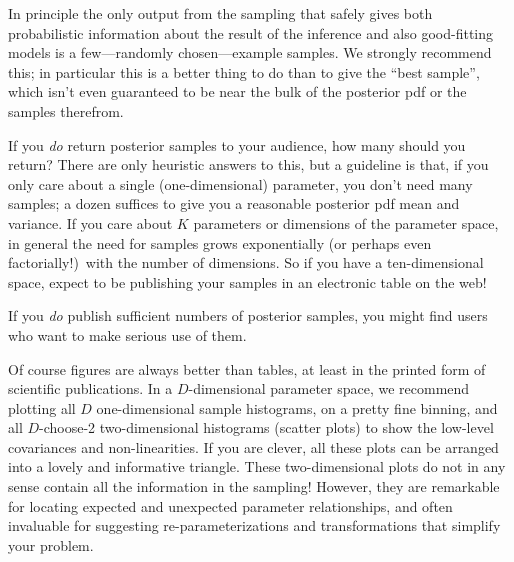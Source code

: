 \documentclass[12pt,twoside,pdftex]{article}
\begin{document}
In principle the only output from the sampling that safely gives both
probabilistic information about the result of the inference and also
good-fitting models is a few---randomly chosen---example samples.
We strongly recommend this; in
particular this is a better thing to do than to give the ``best
sample'', which isn't even guaranteed to be near the bulk of the
posterior pdf or the samples therefrom.

If you \emph{do} return posterior samples to your audience, how many
should you return?
There are only heuristic answers to this, but a guideline is that, if
you only care about a single (one-dimensional) parameter, you don't
need many samples; a dozen suffices to give you a reasonable posterior
pdf mean and variance.
If you care about $K$ parameters or dimensions of the parameter space,
in general the need for samples grows exponentially (or perhaps even
factorially!)\ with the number of dimensions.
So if you have a ten-dimensional space, expect to be publishing your
samples in an electronic table on the web!

If you \emph{do} publish sufficient numbers of posterior samples, you
might find users who want to make serious use of them.

Of course figures are always better than tables, at least in the
printed form of scientific publications.
In a $D$-dimensional parameter space, we recommend plotting all $D$
one-dimensional sample histograms, on a pretty fine binning, and all
$D$-choose-2 two-dimensional histograms (scatter plots) to show the
low-level covariances and non-linearities.
If you are clever, all these plots can be arranged into a lovely and
informative triangle.
These two-dimensional plots do not in any sense contain all the
information in the sampling!  However, they are remarkable for
locating expected and unexpected parameter relationships, and often
invaluable for suggesting re-parameterizations and transformations
that simplify your problem.
\end{document}
